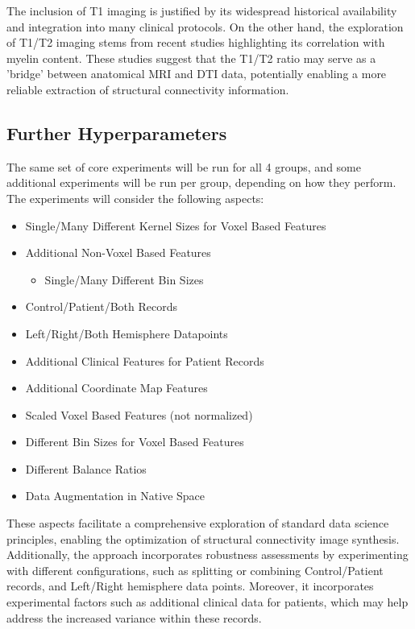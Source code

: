 The inclusion of T1 imaging is justified by its widespread historical availability and integration into many clinical protocols. On the other hand, the exploration of T1/T2 imaging stems from recent studies highlighting its correlation with myelin content. These studies suggest that the T1/T2 ratio may serve as a 'bridge' between anatomical \ac{MRI} and \ac{DTI} data, potentially enabling a more reliable extraction of structural connectivity information.

\subsection{Further Hyperparameters}

The same set of core experiments will be run for all 4 groups, and some additional experiments will be run per group, depending on how they perform. The experiments will consider the following aspects:
\begin{itemize}
  \item Single/Many Different Kernel Sizes for Voxel Based Features
  \item Additional Non-Voxel Based Features
  \begin{itemize}
    \item Single/Many Different Bin Sizes
  \end{itemize}
  \item Control/Patient/Both Records
  \item Left/Right/Both Hemisphere Datapoints
  \item Additional Clinical Features for Patient Records
  \item Additional Coordinate Map Features
  \item Scaled Voxel Based Features (not normalized)
  \item Different Bin Sizes for Voxel Based Features
  \item Different Balance Ratios
  \item Data Augmentation in Native Space
\end{itemize}

These aspects facilitate a comprehensive exploration of standard data science principles, enabling the optimization of structural connectivity image synthesis. Additionally, the approach incorporates robustness assessments by experimenting with different configurations, such as splitting or combining Control/Patient records, and Left/Right hemisphere data points. Moreover, it incorporates experimental factors such as additional clinical data for patients, which may help address the increased variance within these records.

